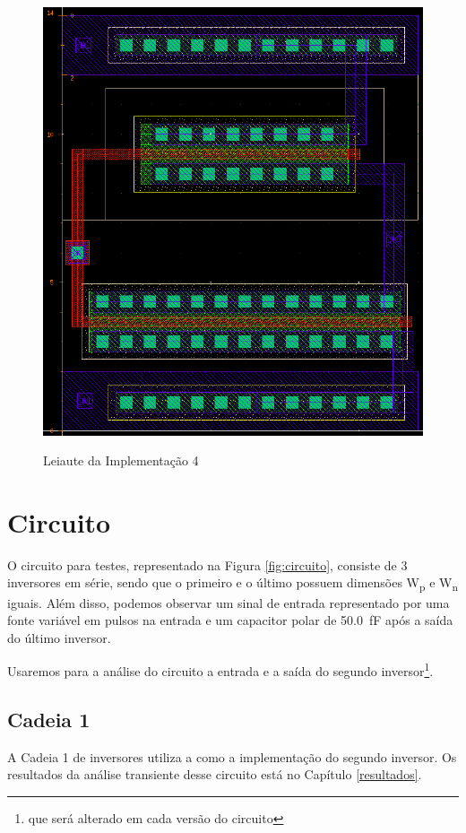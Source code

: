 \documentclass{iiufrgs}
\begin{document}
\begin{figure}[htbp]
    \centering
    \caption{Leiaute da Implementação 4}
    \includegraphics[scale=0.8]{images/layout4.png}
    \label{fig:leiaute4}
\end{figure}

\FloatBarrier

\section{Circuito}
O circuito para testes, representado na Figura \ref{fig:circuito}, consiste de 3 inversores em série, sendo que o primeiro e o último possuem dimensões W\textsubscript{p} e W\textsubscript{n} iguais. Além disso, podemos observar um sinal de entrada representado por uma fonte variável em pulsos na entrada e um capacitor polar de \SI{50.0}{\fF} após a saída do último inversor.\

Usaremos para a análise do circuito a entrada e a saída do segundo inversor\footnote{que será alterado em cada versão do circuito}.

\subsection{Cadeia 1}
A Cadeia 1 de inversores utiliza a  como a implementação do segundo inversor. Os resultados da análise transiente desse circuito está no Capítulo \ref{resultados}.\
\end{document}
